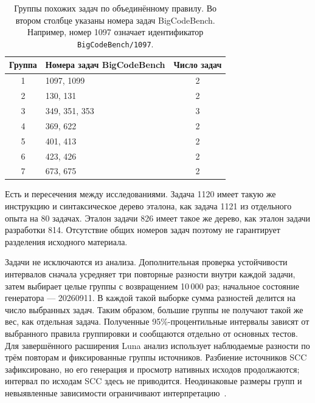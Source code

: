 \begin{table}[htbp]\centering
\caption{Группы похожих задач по объединённому правилу. Во втором столбце указаны номера задач BigCodeBench. Например, номер 1097 означает идентификатор \texttt{BigCodeBench/1097}.}
\label{tab:source-groups}
\begin{tabular}{clc}\toprule
Группа & Номера задач BigCodeBench & Число задач\\\midrule
1 & 1097, 1099 & 2\\
2 & 130, 131 & 2\\
3 & 349, 351, 353 & 3\\
4 & 369, 622 & 2\\
5 & 401, 413 & 2\\
6 & 423, 426 & 2\\
7 & 673, 675 & 2\\\bottomrule
\end{tabular}
\end{table}

Есть и пересечения между исследованиями. Задача 1120 имеет такую же инструкцию и синтаксическое дерево эталона, как задача 1121 из отдельного опыта на 80 задачах. Эталон задачи 826 имеет такое же дерево, как эталон задачи разработки 814. Отсутствие общих номеров задач поэтому не гарантирует разделения исходного материала.

Задачи не исключаются из анализа. Дополнительная проверка устойчивости интервалов сначала усредняет три повторные разности внутри каждой задачи, затем выбирает целые группы с возвращением 10\,000 раз; начальное состояние генератора --- 20260911. В каждой такой выборке сумма разностей делится на число выбранных задач. Таким образом, большие группы не получают такой же вес, как отдельная задача. Полученные 95\%-процентильные интервалы зависят от выбранного правила группировки и сообщаются отдельно от основных тестов. Для завершённого расширения Luna анализ использует наблюдаемые разности по трём повторам и фиксированные группы источников. Разбиение источников SCC зафиксировано, но его генерация и просмотр нативных исходов продолжаются; интервал по исходам SCC здесь не приводится. Неодинаковые размеры групп и невыявленные зависимости ограничивают интерпретацию~\cite{mackinnon2023clusters}.

